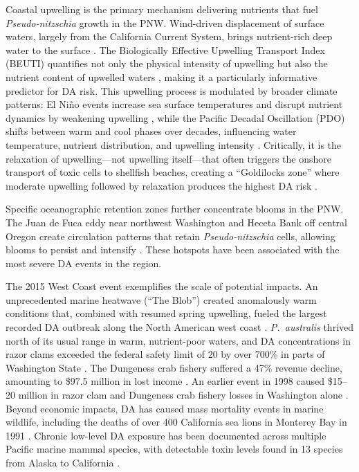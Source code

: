 \documentclass[preprint,12pt,authoryear]{elsarticle}
\begin{document}
Coastal upwelling is the primary mechanism delivering nutrients that fuel \textit{Pseudo-nitzschia} growth in the PNW. Wind-driven displacement of surface waters, largely from the California Current System, brings nutrient-rich deep water to the surface \citep{McKibben2017, Trainer2009}. The Biologically Effective Upwelling Transport Index (BEUTI) quantifies not only the physical intensity of upwelling but also the nutrient content of upwelled waters \citep{Jacox2018}, making it a particularly informative predictor for DA risk. This upwelling process is modulated by broader climate patterns: El Ni\~no events increase sea surface temperatures and disrupt nutrient dynamics by weakening upwelling \citep{Zhu2017}, while the Pacific Decadal Oscillation (PDO) shifts between warm and cool phases over decades, influencing water temperature, nutrient distribution, and upwelling intensity \citep{Mantua1997, Wolter2011, DiLorenzo2016}. Critically, it is the relaxation of upwelling---not upwelling itself---that often triggers the onshore transport of toxic cells to shellfish beaches, creating a ``Goldilocks zone'' where moderate upwelling followed by relaxation produces the highest DA risk \citep{Trainer2002, Trainer2020}.

Specific oceanographic retention zones further concentrate blooms in the PNW. The Juan de Fuca eddy near northwest Washington and Heceta Bank off central Oregon create circulation patterns that retain \textit{Pseudo-nitzschia} cells, allowing blooms to persist and intensify \citep{Trainer2009, Trainer2002, McCabe2023}. These hotspots have been associated with the most severe DA events in the region.

The 2015 West Coast event exemplifies the scale of potential impacts. An unprecedented marine heatwave (``The Blob'') created anomalously warm conditions that, combined with resumed spring upwelling, fueled the largest recorded DA outbreak along the North American west coast \citep{McCabe2016, Bond2015}. \textit{P.\ australis} thrived north of its usual range in warm, nutrient-poor waters, and DA concentrations in razor clams exceeded the federal safety limit of \SI{20}{\microgrampeg} by over 700\% in parts of Washington State \citep{McCabe2016, Trainer2020}. The Dungeness crab fishery suffered a 47\% revenue decline, amounting to \$97.5 million in lost income \citep{Moore2020}. An earlier event in 1998 caused \$15--20 million in razor clam and Dungeness crab fishery losses in Washington alone \citep{Lewitus2012, Dyson2010}. Beyond economic impacts, DA has caused mass mortality events in marine wildlife, including the deaths of over 400 California sea lions in Monterey Bay in 1991 \citep{Scholin2000, Lefebvre2010}. Chronic low-level DA exposure has been documented across multiple Pacific marine mammal species, with detectable toxin levels found in 13 species from Alaska to California \citep{Lefebvre2016}.
\end{document}
